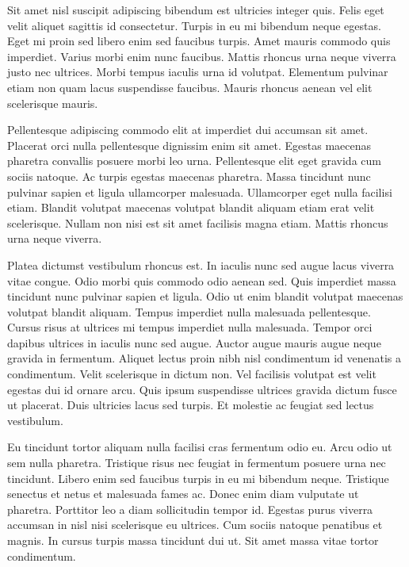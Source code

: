 \documentclass[11pt,a4paper]{article}
\begin{document}
Sit amet nisl suscipit adipiscing bibendum est ultricies integer quis. Felis eget velit aliquet sagittis id consectetur. Turpis in eu mi bibendum neque egestas. Eget mi proin sed libero enim sed faucibus turpis. Amet mauris commodo quis imperdiet. Varius morbi enim nunc faucibus. Mattis rhoncus urna neque viverra justo nec ultrices. Morbi tempus iaculis urna id volutpat. Elementum pulvinar etiam non quam lacus suspendisse faucibus. Mauris rhoncus aenean vel elit scelerisque mauris.

Pellentesque adipiscing commodo elit at imperdiet dui accumsan sit amet. Placerat orci nulla pellentesque dignissim enim sit amet. Egestas maecenas pharetra convallis posuere morbi leo urna. Pellentesque elit eget gravida cum sociis natoque. Ac turpis egestas maecenas pharetra. Massa tincidunt nunc pulvinar sapien et ligula ullamcorper malesuada. Ullamcorper eget nulla facilisi etiam. Blandit volutpat maecenas volutpat blandit aliquam etiam erat velit scelerisque. Nullam non nisi est sit amet facilisis magna etiam. Mattis rhoncus urna neque viverra.

Platea dictumst vestibulum rhoncus est. In iaculis nunc sed augue lacus viverra vitae congue. Odio morbi quis commodo odio aenean sed. Quis imperdiet massa tincidunt nunc pulvinar sapien et ligula. Odio ut enim blandit volutpat maecenas volutpat blandit aliquam. Tempus imperdiet nulla malesuada pellentesque. Cursus risus at ultrices mi tempus imperdiet nulla malesuada. Tempor orci dapibus ultrices in iaculis nunc sed augue. Auctor augue mauris augue neque gravida in fermentum. Aliquet lectus proin nibh nisl condimentum id venenatis a condimentum. Velit scelerisque in dictum non. Vel facilisis volutpat est velit egestas dui id ornare arcu. Quis ipsum suspendisse ultrices gravida dictum fusce ut placerat. Duis ultricies lacus sed turpis. Et molestie ac feugiat sed lectus vestibulum.

Eu tincidunt tortor aliquam nulla facilisi cras fermentum odio eu. Arcu odio ut sem nulla pharetra. Tristique risus nec feugiat in fermentum posuere urna nec tincidunt. Libero enim sed faucibus turpis in eu mi bibendum neque. Tristique senectus et netus et malesuada fames ac. Donec enim diam vulputate ut pharetra. Porttitor leo a diam sollicitudin tempor id. Egestas purus viverra accumsan in nisl nisi scelerisque eu ultrices. Cum sociis natoque penatibus et magnis. In cursus turpis massa tincidunt dui ut. Sit amet massa vitae tortor condimentum.
\end{document}
